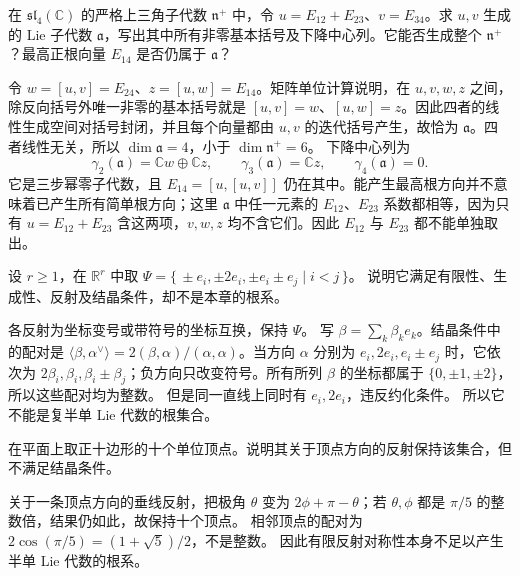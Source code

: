 \begin{exercise}\label{b5:ex:16-generating-high-root}
	在 \(\mathfrak{sl}_4(\mathbb C)\) 的严格上三角子代数 \(\mathfrak n^+\) 中，令 \(u=E_{12}+E_{23}\)、\(v=E_{34}\)。求 \(u,v\) 生成的 Lie 子代数 \(\mathfrak a\)，写出其中所有非零基本括号及下降中心列。它能否生成整个 \(\mathfrak n^+\)？最高正根向量 \(E_{14}\) 是否仍属于 \(\mathfrak a\)？
\end{exercise}
\begin{solution}
	令 \(w=[u,v]=E_{24}\)、\(z=[u,w]=E_{14}\)。矩阵单位计算说明，在 \(u,v,w,z\) 之间，除反向括号外唯一非零的基本括号就是 \([u,v]=w\)、\([u,w]=z\)。因此四者的线性生成空间对括号封闭，并且每个向量都由 \(u,v\) 的迭代括号产生，故恰为 \(\mathfrak a\)。四者线性无关，所以 \(\dim\mathfrak a=4\)，小于 \(\dim\mathfrak n^+=6\)。 下降中心列为
	\[
		\gamma_2(\mathfrak a)=\mathbb Cw\oplus\mathbb Cz, \qquad\gamma_3(\mathfrak a)=\mathbb Cz, \qquad\gamma_4(\mathfrak a)=0.
	\]
	它是三步幂零子代数，且 \(E_{14}=[u,[u,v]]\) 仍在其中。能产生最高根方向并不意味着已产生所有简单根方向；这里 \(\mathfrak a\) 中任一元素的 \(E_{12}\)、\(E_{23}\) 系数都相等，因为只有 \(u=E_{12}+E_{23}\) 含这两项，\(v,w,z\) 均不含它们。因此 \(E_{12}\) 与 \(E_{23}\) 都不能单独取出。
\end{solution}

\begin{exercise}\label{b5:ex:16-nonreduced}
	设 \(r\ge1\)，在 \(\mathbb R^r\) 中取 \(\Psi=\{\,\pm e_i,\pm2e_i,\pm e_i\pm e_j\mid i<j\,\}\)。 说明它满足有限性、生成性、反射及结晶条件，却不是本章的根系。
\end{exercise}
\begin{solution}
	各反射为坐标变号或带符号的坐标互换，保持 \(\Psi\)。 写 \(\beta=\sum_k\beta_ke_k\)。结晶条件中的配对是 \(\langle\beta,\alpha^\vee\rangle=2(\beta,\alpha)/(\alpha,\alpha)\)。当方向 \(\alpha\) 分别为 \(e_i,2e_i,e_i\pm e_j\) 时，它依次为 \(2\beta_i,\beta_i,\beta_i\pm\beta_j\)；负方向只改变符号。所有所列 \(\beta\) 的坐标都属于 \(\{0,\pm1,\pm2\}\)，所以这些配对均为整数。 但是同一直线上同时有 \(e_i,2e_i\)，违反约化条件。 所以它不能是复半单 Lie 代数的根集合。
\end{solution}

\begin{exercise}\label{b5:ex:16-crystallographic-failure}
	在平面上取正十边形的十个单位顶点。说明其关于顶点方向的反射保持该集合，但不满足结晶条件。
\end{exercise}
\begin{solution}
	关于一条顶点方向的垂线反射，把极角 \(\theta\) 变为 \(2\phi+\pi-\theta\)；若 \(\theta,\phi\) 都是 \(\pi/5\) 的整数倍，结果仍如此，故保持十个顶点。 相邻顶点的配对为 \(2\cos(\pi/5)=(1+\sqrt5)/2\)，不是整数。 因此有限反射对称性本身不足以产生半单 Lie 代数的根系。
\end{solution}

